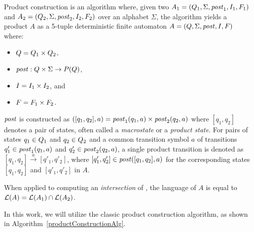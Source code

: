 \begin{definition} \hfill \newline
Product construction is an algorithm where, given two \nfas $A_1 = (Q_1, \Sigma, \mathit{post}_1, I_1, F_1)$ and $A_2 = (Q_2, \Sigma, \mathit{post}_2, I_2, F_2)$ over an alphabet $\Sigma$, the algorithm yields a product \nfa $A$ as a 5-tuple deterministic finite automaton $A = (Q, \Sigma, \mathit{post}, I, F)$ where:
\begin{itemize}
    \item $Q = Q_1 \times Q_2$,
    \item $\mathit{post}: Q \times \Sigma \rightarrow{} P(Q)$,
    \item $I = I_1 \times I_2$, and
    \item $F = F_1 \times F_2$.
\end{itemize}
\end{definition}

$\mathit{post}$ is constructed as $([q_1, q_2], a) = \mathit{post}_1(q_1, a) \times \mathit{post}_2(q_2, a)$ where $[q_1, q_2]$ denotes a pair of states, often called a \emph{macrostate} or a \emph{product state}. For pairs of states $q_1 \in Q_1$ and $q_2 \in Q_2$ and a common transition symbol $a$ of transitions $q'_1 \in \mathit{post}_1(q_1, a)$ and $q'_2 \in \mathit{post}_2(q_2,a)$, a single product transition is denoted as $[q_1, q_2] \xrightarrow{a} [q'_1, q'_2]$, where $[q'_1, q'_2] \in \mathit{post}([q_1, q_2], a)$ for the corresponding states $[q_1, q_2]$ and $[q'_1, q'_2]$ in $A$.

When applied to computing an \emph{intersection} of \nfas, the language of $A$ is equal to $ \mathcal{L}(A) = \mathcal{L}(A_1) \cap \mathcal{L}(A_2) $.

In this work, we will utilize the classic product construction algorithm, as shown in Algorithm~\ref{productConstructionAlg}.

